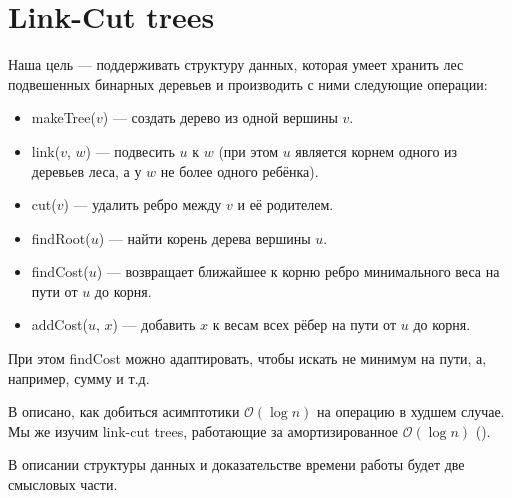 \section{Link-Cut trees}

Наша цель --- поддерживать структуру данных, которая умеет хранить лес подвешенных бинарных деревьев и производить с ними следующие операции:

\begin{itemize}
    \item makeTree($v$) --- создать дерево из одной вершины $v$.
    \item link($v$, $w$) --- подвесить $u$ к $w$ (при этом $u$ является корнем одного из деревьев леса, а у $w$ не более одного ребёнка).
    \item cut($v$) --- удалить ребро между $v$ и её родителем.
    \item findRoot($u$) --- найти корень дерева вершины $u$.
    \item findCost($u$) --- возвращает ближайшее к корню ребро минимального веса на пути от $u$ до корня.
    \item addCost($u$, $x$) --- добавить $x$ к весам всех рёбер на пути от $u$ до корня.
\end{itemize}

При этом findCost можно адаптировать, чтобы искать не минимум на пути, а, например, сумму и т.д.

В \cite{sleator1983linkcut} описано, как добиться асимптотики $\mathcal{O}(\log{n})$ на операцию в худшем случае. Мы же изучим link-cut trees, работающие за амортизированное $\mathcal{O}(\log{n})$ (\cite{tarjan1984linkcut}).

В описании структуры данных и доказательстве времени работы будет две смысловых части.


